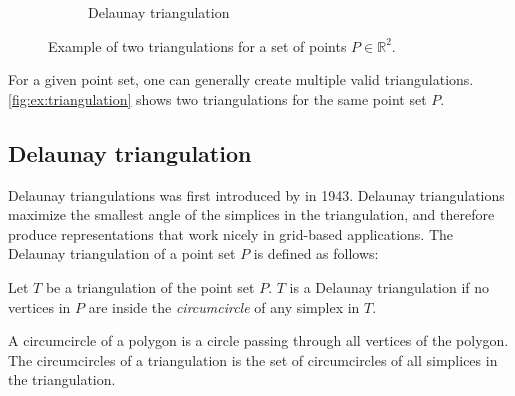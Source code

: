 \begin{figure}[ht]
\begin{subfigure}[b]{0.4\textwidth}
        \caption{Delaunay triangulation}
        \label{fig:triangulation-delaunay}
    \end{subfigure}
    \caption[Example of triangulation]{Example of two triangulations for a set of points $P \in \mathbb{R}^2$.}
    \label{fig:ex:triangulation}
\end{figure}

For a given point set, one can generally create multiple valid triangulations. \autoref{fig:ex:triangulation} shows two triangulations for the same point set $P$.


\subsection{Delaunay triangulation}
Delaunay triangulations was first introduced by \textcite{delaunay_1943} in 1943. Delaunay triangulations maximize the smallest angle of the simplices in the triangulation, and therefore produce representations that work nicely in grid-based applications. The Delaunay triangulation of a point set $P$ is defined as follows:
\begin{definition}
\label{def:delaunay}
Let $T$ be a triangulation of the point set $P$. $T$ is a Delaunay triangulation if no vertices in $P$ are inside the \emph{circumcircle} of any simplex in $T$.
\end{definition}

\begin{definition}[Circumcircle]
A circumcircle of a polygon is a circle passing through all vertices of the polygon. The circumcircles of a triangulation is the set of circumcircles of all simplices in the triangulation.
\end{definition}

